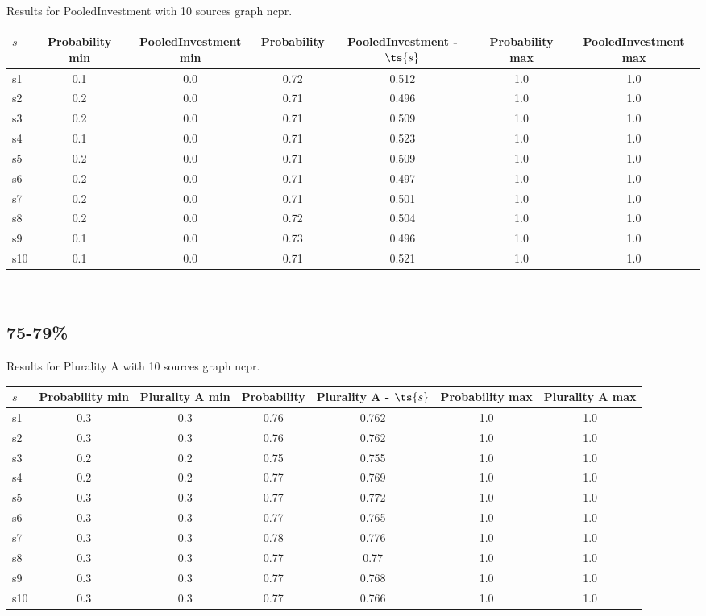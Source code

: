 \documentclass{article}
\begin{document}
\noindent Results for PooledInvestment with 10 sources graph ncpr.

\noindent\begin{tabular}{|l|c|c|c|c|c|c|}
\hline
$s$& Probability min & PooledInvestment min & Probability & PooledInvestment - $\ts{s}$ & Probability max & PooledInvestment max\\
\hline
s1 &0.1 & 0.0 & 0.72 & 0.512 & 1.0 & 1.0\\
\hline
s2 &0.2 & 0.0 & 0.71 & 0.496 & 1.0 & 1.0\\
\hline
s3 &0.2 & 0.0 & 0.71 & 0.509 & 1.0 & 1.0\\
\hline
s4 &0.1 & 0.0 & 0.71 & 0.523 & 1.0 & 1.0\\
\hline
s5 &0.2 & 0.0 & 0.71 & 0.509 & 1.0 & 1.0\\
\hline
s6 &0.2 & 0.0 & 0.71 & 0.497 & 1.0 & 1.0\\
\hline
s7 &0.2 & 0.0 & 0.71 & 0.501 & 1.0 & 1.0\\
\hline
s8 &0.2 & 0.0 & 0.72 & 0.504 & 1.0 & 1.0\\
\hline
s9 &0.1 & 0.0 & 0.73 & 0.496 & 1.0 & 1.0\\
\hline
s10 &0.1 & 0.0 & 0.71 & 0.521 & 1.0 & 1.0\\
\hline
\end{tabular}\\

\newpage

\subsection{75-79\%}

\noindent Results for Plurality A with 10 sources graph ncpr.

\noindent\begin{tabular}{|l|c|c|c|c|c|c|}
\hline
$s$& Probability min & Plurality A min & Probability & Plurality A - $\ts{s}$ & Probability max & Plurality A max\\
\hline
s1 &0.3 & 0.3 & 0.76 & 0.762 & 1.0 & 1.0\\
\hline
s2 &0.3 & 0.3 & 0.76 & 0.762 & 1.0 & 1.0\\
\hline
s3 &0.2 & 0.2 & 0.75 & 0.755 & 1.0 & 1.0\\
\hline
s4 &0.2 & 0.2 & 0.77 & 0.769 & 1.0 & 1.0\\
\hline
s5 &0.3 & 0.3 & 0.77 & 0.772 & 1.0 & 1.0\\
\hline
s6 &0.3 & 0.3 & 0.77 & 0.765 & 1.0 & 1.0\\
\hline
s7 &0.3 & 0.3 & 0.78 & 0.776 & 1.0 & 1.0\\
\hline
s8 &0.3 & 0.3 & 0.77 & 0.77 & 1.0 & 1.0\\
\hline
s9 &0.3 & 0.3 & 0.77 & 0.768 & 1.0 & 1.0\\
\hline
s10 &0.3 & 0.3 & 0.77 & 0.766 & 1.0 & 1.0\\
\hline
\end{tabular}\\
\end{document}
